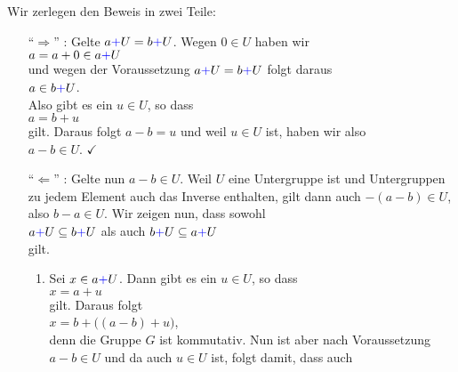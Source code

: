 \proof
Wir zerlegen den Beweis in zwei Teile:
\begin{enumerate}
\item[``$\Rightarrow$'']:
  Gelte $a {\color{blue}{+}} U = b {\color{blue}{+}} U$.  Wegen $0 \in U$ haben wir
  \\[0.2cm]
  \hspace*{1.3cm}
  $a = a + 0 \in a {\color{blue}{+}} U$
  \\[0.2cm]
  und wegen der Voraussetzung $a {\color{blue}{+}} U = b {\color{blue}{+}} U$ folgt daraus
  \\[0.2cm]
  \hspace*{1.3cm}
  $a \in b {\color{blue}{+}} U$.
  \\[0.2cm]
  Also gibt es ein $u \in U$, so dass
  \\[0.2cm]
  \hspace*{1.3cm}
  $a = b + u$
  \\[0.2cm]
  gilt.  Daraus folgt $a - b = u$ und weil $u \in U$ ist, haben wir also
  \\[0.2cm]
  \hspace*{1.3cm}
  $a - b \in U$.  {\color{green}$\checkmark$}
\item[``$\Leftarrow$'']: Gelte nun $a - b \in U$.  Weil $U$ eine Untergruppe ist und Untergruppen zu jedem
  Element auch das Inverse enthalten, gilt dann auch $-(a -b) \in U$, also $b - a \in U$.  Wir zeigen
  nun, dass sowohl
  \\[0.2cm]
  \hspace*{1.3cm} 
  $a {\color{blue}{+}} U \subseteq b {\color{blue}{+}} U$ \quad als auch \quad
  $b {\color{blue}{+}} U \subseteq a {\color{blue}{+}} U$ 
  \\[0.2cm]
  gilt.
  \begin{enumerate}
  \item Sei $x \in a {\color{blue}{+}} U$.  Dann gibt es ein $u \in U$, so dass
        \\[0.2cm]
        \hspace*{1.3cm}
        $x = a + u$
        \\[0.2cm]
        gilt.  Daraus folgt
        \\[0.2cm]
        \hspace*{1.3cm}
        $x = b + \bigl((a - b) + u\bigr)$,
        \\[0.2cm]
        denn die Gruppe $G$ ist kommutativ.
        Nun ist aber nach Voraussetzung $a - b \in U$ und da auch $u \in U$ ist, folgt damit, dass auch
        \\[0.2cm]
        \hspace*{1.3cm}

\end{enumerate}
\end{enumerate}
